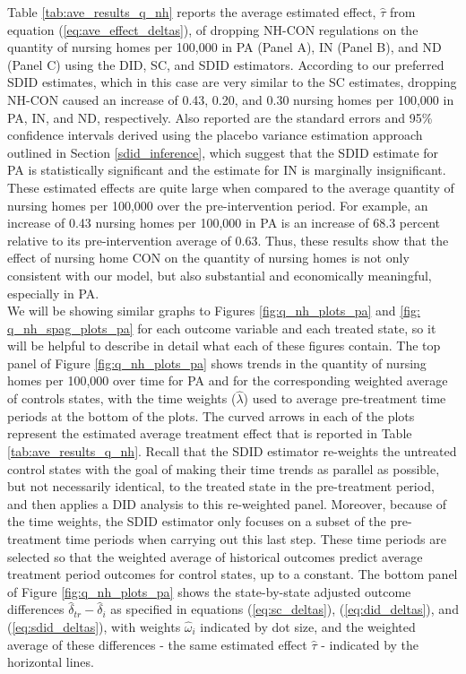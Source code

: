 \documentclass[../Main.tex]{subfiles}
\begin{document}
\indent Table \ref{tab:ave_results_q_nh} reports the average estimated effect, $\hat{\tau}$ from equation (\ref{eq:ave_effect_deltas}), of dropping NH-CON regulations on the quantity of nursing homes per 100,000 in PA (Panel A), IN (Panel B), and ND (Panel C) using the DID, SC, and SDID estimators. According to our preferred SDID estimates, which in this case are very similar to the SC estimates, dropping NH-CON caused an increase of 0.43, 0.20, and 0.30 nursing homes per 100,000 in PA, IN, and ND, respectively. Also reported are the standard errors and 95\% confidence intervals derived using the placebo variance estimation approach outlined in Section \ref{sdid_inference}, which suggest that the SDID estimate for PA is statistically significant and the estimate for IN is marginally insignificant. These estimated effects are quite large when compared to the average quantity of nursing homes per 100,000 over the pre-intervention period. For example, an increase of 0.43 nursing homes per 100,000 in PA is an increase of 68.3 percent relative to its pre-intervention average of 0.63. Thus, these results show that the effect of nursing home CON on the quantity of nursing homes is not only consistent with our model, but also substantial and economically meaningful, especially in PA.  \\
\indent We will be showing similar graphs to Figures \ref{fig:q_nh_plots_pa} and \ref{fig: q_nh_spag_plots_pa} for each outcome variable and each treated state, so it will be helpful to describe in detail what each of these figures contain. The top panel of Figure \ref{fig:q_nh_plots_pa} shows trends in the quantity of nursing homes per 100,000 over time for PA and for the corresponding weighted average of controls states, with the time weights ($\hat{\lambda}$) used to average pre-treatment time periods at the bottom of the plots. The curved arrows in each of the plots represent the estimated average treatment effect that is reported in Table \ref{tab:ave_results_q_nh}. Recall that the SDID estimator re-weights the untreated control states with the goal of making their time trends as parallel as possible, but not necessarily identical, to the treated state in the pre-treatment period, and then applies a DID analysis to this re-weighted panel. Moreover, because of the time weights, the SDID estimator only focuses on a subset of the pre-treatment time periods when carrying out this last step. These time periods are selected so that the weighted average of historical outcomes predict average treatment period outcomes for control states, up to a constant. The bottom panel of Figure \ref{fig:q_nh_plots_pa} shows the state-by-state adjusted outcome differences $\hat{\delta}_{tr}-\hat{\delta}_i$ as specified in equations (\ref{eq:sc_deltas}), (\ref{eq:did_deltas}), and (\ref{eq:sdid_deltas}), with weights $\hat{\omega}_i$ indicated by dot size, and the weighted average of these differences - the same estimated effect $\hat{\tau}$ - indicated by the horizontal lines.\\
\end{document}
